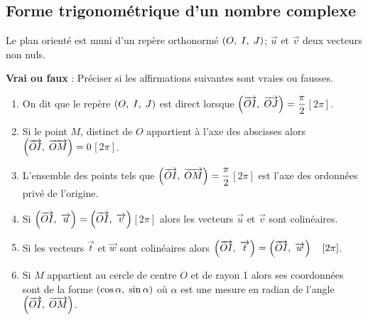 \subsection{ Forme trigonométrique d'un  nombre complexe}
\begin{lemma}
Le plan orienté est muni d'un repère orthonormé   $ \left(O,\; I, \; J\right) $; \; $\overrightarrow{u} $ et $ \overrightarrow{v}$ deux vecteurs non nuls.

\medskip

\textbf{Vrai ou faux}\; : Préciser si les affirmations suivantes sont vraies ou fausses.
\begin{enumerate}
        \item On dit que le repère  $ \left(O,\; I, \; J\right) $ \; est direct  lorsque  $ \left( \overrightarrow{OI},\;\overrightarrow{OJ} \right)=\dfrac{\pi}{2} $\quad$ [2\pi] $.
        \item Si le point $ M $, distinct de $ O $ appartient à l'axe des abscisses alors  $ \left( \overrightarrow{OI},\;\overrightarrow{OM} \right)=0 $\quad$ [2\pi] $.
        \item L'ensemble des points tels que  $ \left( \overrightarrow{OI},\;\overrightarrow{OM} \right)=\dfrac{\pi}{2} $\quad$ [2\pi] $ est l'axe des ordonnées privé de l'origine.
        \item Si  $ \left( \overrightarrow{OI},\;\overrightarrow{u} \right)= \left( \overrightarrow{OI},\;\overrightarrow{v} \right)$\quad $ [2\pi] $ alors les vecteurs $ \overrightarrow{u}$ et $\overrightarrow{v} $ sont colinéaires.
        \item Si les vecteurs $ \overrightarrow{t}$ et $\overrightarrow{w} $ sont colinéaires alors    $ \left( \overrightarrow{OI},\;\overrightarrow{t} \right)= \left( \overrightarrow{OI},\;\overrightarrow{w} \right)\quad  [2\pi] $.
        \item Si $ M $ appartient au cercle de centre $ O $ et de rayon 1 alors ses coordonnées sont de la forme $ \left(\cos \alpha ,\; \sin \alpha\right) $ où $ \alpha $ est une mesure en radian de l'angle $ \left( \overrightarrow{OI},\;\overrightarrow{OM} \right) $.
        \end{enumerate}
        \end{lemma}
